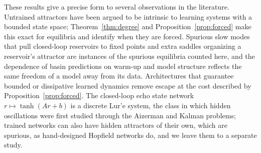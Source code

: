 These results give a precise form to several observations in the literature. Untrained attractors have been argued to be
intrinsic to learning systems with a bounded state space;\cite{OHagan2025Confabulation} Theorem~\ref{thm:degree} and
Proposition~\ref{prop:forced} make this exact for equilibria and identify when they are forced. Spurious slow modes that
pull closed-loop reservoirs to fixed points\cite{Oishi2026FastSlow} and extra saddles organizing a reservoir's
attractor\cite{Kabayama2025PseudoLorenz} are instances of the spurious equilibria counted here, and the dependence of basin
predictions on warm-up and model structure\cite{ZhangCornelius2023} reflects the same freedom of a model away from its data.
Architectures that guarantee bounded or dissipative learned
dynamics\cite{Kaptanoglu2021Trapping,Linot2023Stabilized,Tang2026Dissipative} remove escape at the cost described by
Proposition~\ref{prop:forced}. The closed-loop echo state network $r\mapsto\tanh(Ar+b)$ is a discrete Lur'e system, the class
in which hidden oscillations were first studied through the Aizerman and Kalman
problems;\cite{LeonovKuznetsov2013,Kuznetsov2019KalmanHidden} trained networks can also have hidden attractors of their own,
which are spurious, as hand-designed Hopfield networks do,\cite{DancaKuznetsov2017Hopfield} and we leave them to a separate
study.

